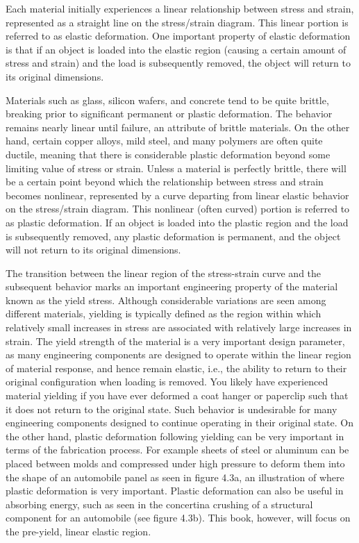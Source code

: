 \documentclass[
  letterpaper,
  DIV=11,
  numbers=noendperiod]{scrreprt}
\theoremstyle{definition}
\theoremstyle{remark}
\begin{document}
Each material initially experiences a linear relationship between stress
and strain, represented as a straight line on the stress/strain diagram.
This linear portion is referred to as elastic deformation. One important
property of elastic deformation is that if an object is loaded into the
elastic region (causing a certain amount of stress and strain) and the
load is subsequently removed, the object will return to its original
dimensions.

Materials such as glass, silicon wafers, and concrete tend to be quite
brittle, breaking prior to significant permanent or plastic deformation.
The behavior remains nearly linear until failure, an attribute of
brittle materials. On the other hand, certain copper alloys, mild steel,
and many polymers are often quite ductile, meaning that there is
considerable plastic deformation beyond some limiting value of stress or
strain. Unless a material is perfectly brittle, there will be a certain
point beyond which the relationship between stress and strain becomes
nonlinear, represented by a curve departing from linear elastic behavior
on the stress/strain diagram. This nonlinear (often curved) portion is
referred to as plastic deformation. If an object is loaded into the
plastic region and the load is subsequently removed, any plastic
deformation is permanent, and the object will not return to its original
dimensions.

The transition between the linear region of the stress-strain curve and
the subsequent behavior marks an important engineering property of the
material known as the yield stress. Although considerable variations are
seen among different materials, yielding is typically defined as the
region within which relatively small increases in stress are associated
with relatively large increases in strain. The yield strength of the
material is a very important design parameter, as many engineering
components are designed to operate within the linear region of material
response, and hence remain elastic, i.e., the ability to return to their
original configuration when loading is removed. You likely have
experienced material yielding if you have ever deformed a coat hanger or
paperclip such that it does not return to the original state. Such
behavior is undesirable for many engineering components designed to
continue operating in their original state. On the other hand, plastic
deformation following yielding can be very important in terms of the
fabrication process. For example sheets of steel or aluminum can be
placed between molds and compressed under high pressure to deform them
into the shape of an automobile panel as seen in figure 4.3a, an
illustration of where plastic deformation is very important. Plastic
deformation can also be useful in absorbing energy, such as seen in the
concertina crushing of a structural component for an automobile (see
figure 4.3b). This book, however, will focus on the pre-yield, linear
elastic region.
\end{document}
